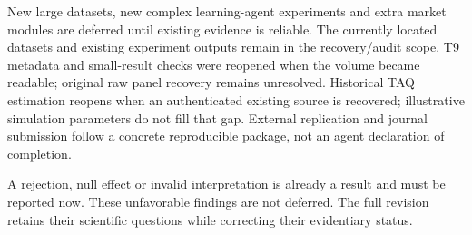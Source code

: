 New large datasets, new complex learning-agent experiments and extra market modules are deferred until existing evidence is reliable. The currently located datasets and existing experiment outputs remain in the recovery/audit scope. T9 metadata and small-result checks were reopened when the volume became readable; original raw panel recovery remains unresolved. Historical TAQ estimation reopens when an authenticated existing source is recovered; illustrative simulation parameters do not fill that gap. External replication and journal submission follow a concrete reproducible package, not an agent declaration of completion.

A rejection, null effect or invalid interpretation is already a result and must be reported now. These unfavorable findings are not deferred. The full revision retains their scientific questions while correcting their evidentiary status.

